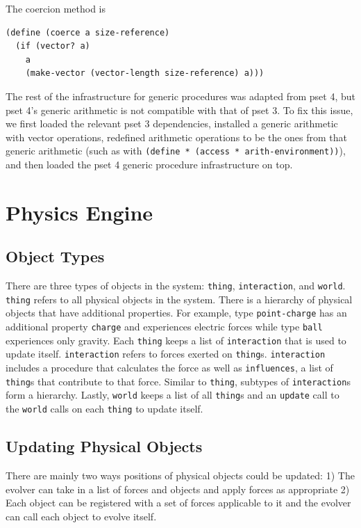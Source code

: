 \documentclass{article}
\begin{document}
The coercion method is 
\begin{verbatim}
(define (coerce a size-reference)
  (if (vector? a)
    a
    (make-vector (vector-length size-reference) a)))
\end{verbatim}

The rest of the infrastructure for generic procedures was adapted from pset 4,
but pset 4's generic arithmetic is not compatible with that of pset 3. To fix
this issue, we first loaded the relevant pset 3 dependencies, installed a
generic arithmetic with vector operations, redefined arithmetic operations to
be the ones from that generic arithmetic (such as with \texttt{(define *
(access * arith-environment))}), and then loaded the pset 4 generic procedure
infrastructure on top.

\section{Physics Engine}
\subsection{Object Types}

There are three types of objects in the system: \texttt{thing}, \texttt{interaction}, and \texttt{world}. \texttt{thing} refers to all physical objects in the system. There is a hierarchy of physical objects that have additional properties. For example, type \texttt{point-charge} has an additional property \texttt{charge} and experiences electric forces while type \texttt{ball} experiences only gravity. Each \texttt{thing} keeps a list of \texttt{interaction} that is used to update itself. \texttt{interaction} refers to forces exerted on \texttt{thing}s. \texttt{interaction} includes a procedure that calculates the force as well as \texttt{influences}, a list of \texttt{thing}s that contribute to that force. Similar to \texttt{thing}, subtypes of \texttt{interaction}s form a hierarchy. Lastly, \texttt{world} keeps a list of all \texttt{thing}s and an \texttt{update} call to the \texttt{world} calls on each \texttt{thing} to update itself.


\subsection{Updating Physical Objects}

There are mainly two ways positions of physical objects could be updated: 1)
The evolver can take in a list of forces and objects and apply forces as
appropriate 2) Each object can be registered with a set of forces applicable to
it and the evolver can call each object to evolve itself.
\end{document}
